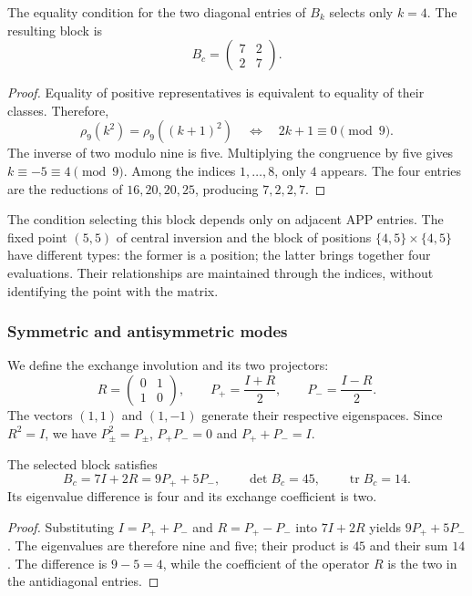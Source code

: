 \begin{teorema}
\label{geo:thm-bloque}
The equality condition for the two diagonal entries of $B_k$ selects only $k=4$. The resulting block is
\[
 B_c=\begin{pmatrix}7&2\\2&7\end{pmatrix}.
\]
\end{teorema}

\begin{proof}
Equality of positive representatives is equivalent to equality of their classes. Therefore,
\[
 \rho_9(k^2)=\rho_9((k+1)^2)
 \quad\Longleftrightarrow\quad 2k+1\equiv0\pmod9.
\]
The inverse of two modulo nine is five. Multiplying the congruence by five gives $k\equiv-5\equiv4\pmod9$. Among the indices $1,\ldots,8$, only $4$ appears. The four entries are the reductions of $16,20,20,25$, producing $7,2,2,7$.
\end{proof}

The condition selecting this block depends only on adjacent APP entries. The fixed point $(5,5)$ of central inversion and the block of positions $\{4,5\}\times\{4,5\}$ have different types: the former is a position; the latter brings together four evaluations. Their relationships are maintained through the indices, without identifying the point with the matrix.

\subsubsection{Symmetric and antisymmetric modes}

We define the exchange involution and its two projectors:
\[
 R=\begin{pmatrix}0&1\\1&0\end{pmatrix},\qquad
 P_+=\frac{I+R}{2},\qquad P_-=\frac{I-R}{2}.
\]
The vectors $(1,1)$ and $(1,-1)$ generate their respective eigenspaces. Since $R^2=I$, we have $P_\pm^2=P_\pm$, $P_+P_-=0$ and $P_++P_-=I$.

\begin{proposicion}
\label{geo:prop-espectro-central}
The selected block satisfies
\[
 B_c=7I+2R=9P_++5P_-,\qquad
 \det B_c=45,\qquad \operatorname{tr}B_c=14.
\]
Its eigenvalue difference is four and its exchange coefficient is two.
\end{proposicion}

\begin{proof}
Substituting $I=P_++P_-$ and $R=P_+-P_-$ into $7I+2R$ yields $9P_++5P_-$. The eigenvalues are therefore nine and five; their product is $45$ and their sum $14$. The difference is $9-5=4$, while the coefficient of the operator $R$ is the two in the antidiagonal entries.
\end{proof}

